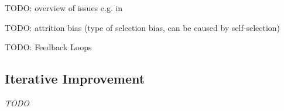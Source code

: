 TODO: overview of issues e.g. in \cite{pelanek-learner-modeling}

TODO: attrition bias (type of selection bias, can be caused by self-selection)

TODO: Feedback Loops


\subsection{Iterative Improvement}
\label{sec:iterative-improvement}

\emph{TODO}

